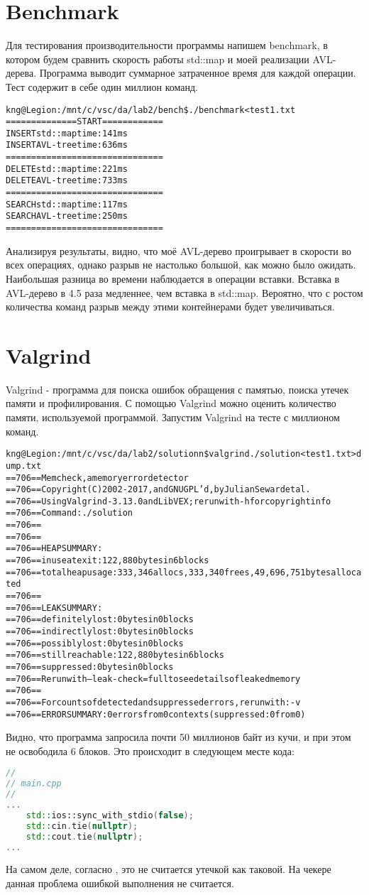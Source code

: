 \section{Benchmark}
Для тестирования производительности программы напишем benchmark, в котором будем сравнить скорость работы std::map и моей реализации AVL-дерева. Программа выводит суммарное затраченное время для каждой операции. Тест содержит в себе один миллион команд.
\begin{alltt}
kng@Legion:/mnt/c/vsc/da/lab2/bench\$ ./benchmark < test1.txt
==============START============
INSERT std::map time: 141 ms
INSERT AVL-tree time: 636 ms
===============================
DELETE std::map time: 221 ms
DELETE AVL-tree time: 733 ms
===============================
SEARCH std::map time: 117 ms
SEARCH AVL-tree time: 250 ms
===============================
\end{alltt}

Анализируя результаты, видно, что моё AVL-дерево проигрывает в скорости во всех операциях, однако разрыв не настолько большой, как можно было ожидать. Наибольшая разница во времени наблюдается в операции вставки. Вставка в AVL-дерево в 4.5 раза медленнее, чем вставка в std::map. Вероятно, что с ростом количества команд разрыв между этими контейнерами будет увеличиваться.

\pagebreak
\section{Valgrind}
Valgrind - программа для поиска ошибок обращения с памятью, поиска утечек памяти и профилирования. С помощью Valgrind можно оценить количество памяти, используемой программой. Запустим Valgrind на тесте с миллионом команд.
\begin{alltt}
kng@Legion:/mnt/c/vsc/da/lab2/solutionn\$ valgrind ./solution < test1.txt > dump.txt
==706== Memcheck, a memory error detector
==706== Copyright (C) 2002-2017, and GNU GPL'd, by Julian Seward et al.   
==706== Using Valgrind-3.13.0 and LibVEX; rerun with -h for copyright info
==706== Command: ./solution
==706==
==706==
==706== HEAP SUMMARY:
==706==     in use at exit: 122,880 bytes in 6 blocks
==706==   total heap usage: 333,346 allocs, 333,340 frees, 49,696,751 bytes allocated
==706==
==706== LEAK SUMMARY:
==706==    definitely lost: 0 bytes in 0 blocks
==706==    indirectly lost: 0 bytes in 0 blocks
==706==      possibly lost: 0 bytes in 0 blocks
==706==    still reachable: 122,880 bytes in 6 blocks
==706==         suppressed: 0 bytes in 0 blocks
==706== Rerun with --leak-check=full to see details of leaked memory  
==706==
==706== For counts of detected and suppressed errors, rerun with: -v  
==706== ERROR SUMMARY: 0 errors from 0 contexts (suppressed: 0 from 0)
\end{alltt}
Видно, что программа запросила почти 50 миллионов байт из кучи, и при этом не освободила 6 блоков. Это происходит в следующем месте кода:
\begin{lstlisting}[language=C++]
// 
// main.cpp
//
...
    std::ios::sync_with_stdio(false);
    std::cin.tie(nullptr);
    std::cout.tie(nullptr);
...
\end{lstlisting}
На самом деле, согласно \cite{leak}, это не считается утечкой как таковой. На чекере данная проблема ошибкой выполнения не считается.
\pagebreak

